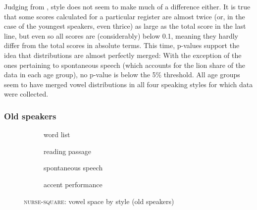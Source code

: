 \largerpage
Judging from , style does not seem to make much of a difference either.
It is true that some  scores calculated for a particular register are almost twice (or, in the case of the youngest speakers, even thrice) as large as the total score in the last line, but even so all  scores are (considerably) below 0.1, meaning they hardly differ from the total scores in absolute terms.
This time, p-values support the idea that distributions are almost perfectly merged: With the exception of the ones pertaining to spontaneous speech (which accounts for the lion share of the data in each age group), no p-value is below the 5\% threshold.
All age groups seem to have merged vowel distributions in all four speaking styles for which data were collected.

\subsubsection{Old speakers}

\begin{figure}[b]
	
	\begin{subfigure}{.49\textwidth}
		
			\resizebox{\linewidth}{!}{} 
		\caption{word list}
		\label{fig.nurse.space.old.list}
	\end{subfigure}
	\begin{subfigure}{.49\textwidth}
		
			\resizebox{\linewidth}{!}{} 
		\caption{reading passage}
		\label{fig.nurse.space.old.read}
	\end{subfigure}
	
	\begin{subfigure}{.49\textwidth}
		
			\resizebox{\linewidth}{!}{} 
		\caption{spontaneous speech}
		\label{fig.nurse.space.old.free}
	\end{subfigure}
	\begin{subfigure}{.49\textwidth}
		
			\resizebox{\linewidth}{!}{} 
		\caption{accent performance}
		\label{fig.nurse.space.old.imit}
	\end{subfigure}
	
	\caption{\textsc{nurse}-\textsc{square}: vowel space by style (old speakers)}
	\label{fig.nurse.space.old}
\end{figure}

